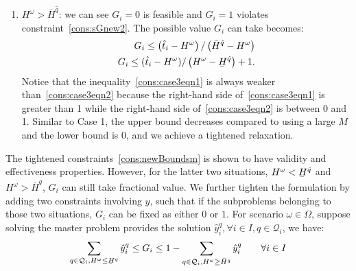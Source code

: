 \documentclass[11pt]{article}
\renewcommand{\underbar}{\underaccent{\bar}}
\begin{document}
\begin{enumerate}
		\item 
		\(H^\omega > \bar{H}^{\hat{q}}\): 
		we can see \(G_i = 0\) is feasible and \(G_i = 1\) violates constraint~\eqref{cons:sGnew2}. The possible value \(G_i\) can take becomes:
		\begin{subequations}
			\begin{align}
			G_i \leq \left(\hat{t}_i - H^\omega \right)/\left( \bar{H}^{\hat{q}} - H^\omega \right) \label{cons:case3eqn1}\\
			G_i \leq (\hat{t}_i - H^\omega)/\left(H^\omega - \underbar{H}^{\hat{q}} \right) + 1. \label{cons:case3eqn2}
			\end{align}
		\end{subequations}
		Notice that the inequality~\eqref{cons:case3eqn1} is always weaker than~\eqref{cons:case3eqn2} because the right-hand side of~\eqref{cons:case3eqn1} is greater than 1 while the right-hand side of~\eqref{cons:case3eqn2} is between 0 and 1. Similar to Case 1, the upper bound decreases compared to using a large \(M\) and the lower bound is \(0\), and we achieve a tightened relaxation.
	\end{enumerate}
	The tightened constraints~\eqref{cons:newBoundsm} is shown to have validity and effectiveness properties. However, for the latter two situations, 
	\(H^\omega < \underbar{H}^{\hat{q}}\) and \(H^\omega > \bar{H}^{\hat{q}}\), 
	\(G_i\) can still take fractional value. We further tighten the formulation by adding two constraints involving \(y\), such that if the subproblems belonging to those two situations, \(G_i\) can be fixed as either \(0\) or \(1\). For scenario \(\omega \in \Omega\), suppose solving the master problem provides the solution \(\hat{y}_i^q, \forall i \in I, q \in \mathcal{Q}_i\), we have:
	\begin{equation}\label{cons:subyG}
	\sum_{q \in \mathcal{Q}_i, H^\omega \leq \underbar{H}^q} \hat{y}_i^q \leq G_i \leq 1 - \sum_{q \in \mathcal{Q}_i, H^\omega \geq \bar{H}^q} \hat{y}_i^q \qquad \forall i \in I 
	\end{equation}
\end{document}
